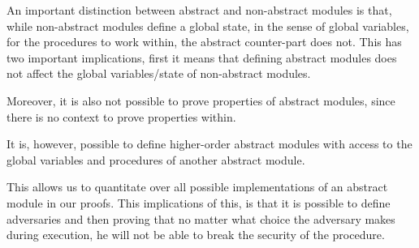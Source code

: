 An important distinction between abstract and non-abstract modules is that,
while non-abstract modules define a global state, in the sense of global
variables, for the procedures to work within, the abstract counter-part does
not. This has two important implications, first it means that defining abstract
modules does not affect the global variables/state of non-abstract modules.
\begin{draft}
Moreover, it is also not possible to prove properties of abstract modules, since
there is no context to prove properties within.
\end{draft}

It is, however, possible to define higher-order abstract modules with access to the global
variables and procedures of another abstract module.

This allows us to quantitate over all possible implementations of an abstract
module in our proofs. This implications of this, is that it is possible to
define adversaries and then proving that no matter what choice the adversary
makes during execution, he will not be able to break the security of the procedure.



